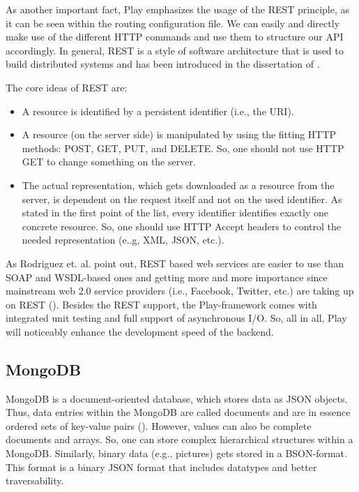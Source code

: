 As another important fact, Play emphasizes the usage of the \ac{REST} principle, as it can be seen within the routing configuration file. We can easily and directly make use of the different \ac{HTTP} commands and use them to structure our \ac{API} accordingly. In general, \acf{REST} is a style of software architecture that is used to build distributed systems and has been introduced in the dissertation of \cite{Fielding2000}.

The core ideas of \ac{REST} are:  
\begin{itemize}
\item A resource is identified by a persistent identifier (i.e., the \ac{URI}).
\item A resource (on the server side) is manipulated by using the fitting \ac{HTTP} methods: POST, GET, PUT, and DELETE. So, one should not use \ac{HTTP} GET to change something on the server.
\item The actual representation, which gets downloaded as a resource from the server, is dependent on the request itself and not on the used identifier. As stated in the first point of the list, every identifier identifies exactly one concrete resource. So, one should use \ac{HTTP} Accept headers to control the needed representation (e..g, \ac{XML}, \ac{JSON}, etc.).
\end{itemize}

As Rodriguez et. al. point out, \ac{REST} based web services are easier to use than \acf{SOAP} and \acf{WSDL}-based ones and getting more and more importance since mainstream web 2.0 service providers (i.e., Facebook, Twitter, etc.) are taking up on \ac{REST} (\cite{Rodriguez2008}). Besides the \ac{REST} support, the Play-framework comes with integrated unit testing and full support of asynchronous I/O.  So, all in all, Play will noticeably enhance the development speed of the backend.

\subsection{MongoDB}
MongoDB is a document-oriented database, which stores data as \ac{JSON} objects. Thus, data entries within the MongoDB are called documents and are in essence ordered sets of key-value pairs (\cite{Tre14}). However, values can also be complete documents and arrays. So, one can store complex hierarchical structures within a MongoDB. Similarly, binary data (e.g., pictures) gets stored in a \ac{BSON}-format. This format is a binary \ac{JSON} format that includes datatypes and better traversability.

